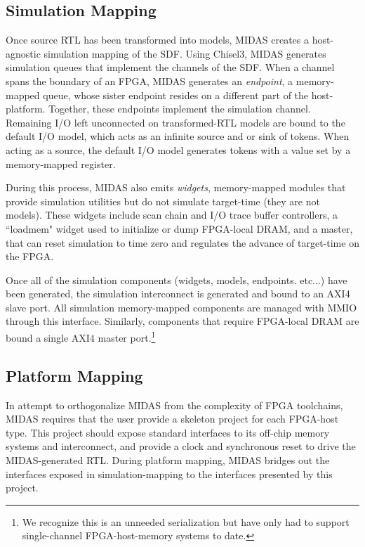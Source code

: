 \subsection{Simulation Mapping}

Once source RTL has been transformed into models, MIDAS creates a
host-agnostic simulation mapping of the SDF. Using Chisel3, MIDAS generates
simulation queues that implement the channels of the SDF. When a channel spans
the boundary of an FPGA, MIDAS generates an \emph{endpoint}, a memory-mapped
queue, whose sister endpoint resides on a different part of the host-platform.
Together, these endpoints implement the simulation channel.  Remaining I/O left
unconnected on transformed-RTL models are bound to the default I/O model, which
acts as an infinite source and or sink of tokens.  When acting as a source, the
default I/O model generates tokens with a value set by a memory-mapped register.

During this process, MIDAS also emits \emph{widgets}, memory-mapped modules
that provide simulation utilities but do not simulate target-time (they are not
models). These widgets include scan chain and I/O trace buffer controllers, a
``loadmem" widget used to initialize or dump FPGA-local DRAM, and a master,
that can reset simulation to time zero and regulates the advance of target-time
on the FPGA.

Once all of the simulation components (widgets, models, endpoints. etc...) have
been generated, the simulation interconnect is generated and bound to an AXI4
slave port. All simulation memory-mapped components are managed with MMIO
through this interface. Similarly, components that require FPGA-local DRAM are
bound a single AXI4 master port.\footnote{We recognize this is an unneeded serialization but have only had to support single-channel FPGA-host-memory systems to date.}

\subsection{Platform Mapping}

In attempt to orthogonalize MIDAS from the complexity of FPGA toolchains, MIDAS
requires that the user provide a skeleton project for each FPGA-host type. This
project should expose standard interfaces to its off-chip memory systems and
interconnect, and provide a clock and synchronous reset to drive the
MIDAS-generated RTL.  During platform mapping, MIDAS bridges out the interfaces
exposed in simulation-mapping to the interfaces presented by this project.

